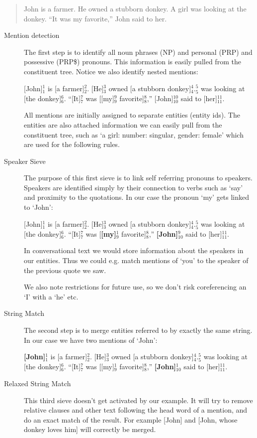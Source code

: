 \documentclass[12pt]{article}
\begin{document}
\begin{quotation}
John is a farmer. He owned a stubborn donkey.
A girl was looking at the donkey.
``It was my favorite,'' John said to her.
\end{quotation}

\begin{description}
\item[Mention detection]
The first step is to identify all noun phrases (NP) and personal (PRP) and possessive (PRP\$) pronouns. This information is easily pulled from the constituent tree. Notice we also identify nested mentions:

[John]$_1^1$ is [a farmer]$_2^2$. [He]$_3^3$ owned [a stubborn donkey]$_4^4$.\newline
[A girl]$_5^5$ was looking at [the donkey]$_6^6$.\newline
``[It]$_7^7$ was [[my]$_9^9$ favorite]$_8^8$,'' [John]$_{10}^{10}$ said to [her]$_{11}^{11}$.

All mentions are initially assigned to separate entities (entity ids). The entities are also attached information we can easily pull from the constituent tree, such as `a girl: {number: singular, gender: female}' which are used for the following rules.
\item[Speaker Sieve]
The purpose of this first sieve is to link self referring pronouns to speakers. Speakers are identified simply by their connection to verbs such as `say' and proximity to the quotations. In our case the pronoun `my' gets linked to `John':

[John]$_1^1$ is [a farmer]$_2^2$. [He]$_3^3$ owned [a stubborn donkey]$_4^4$.\newline
[A girl]$_5^5$ was looking at [the donkey]$_6^6$.\newline
``[It]$_7^7$ was [\textbf{[my]$_9^1$} favorite]$_8^8$,'' \textbf{[John]$_{10}^{9}$} said to [her]$_{11}^{11}$.

In conversational text we would store information about the speakers in our entities. Thus we could e.g. match mentions of `you' to the speaker of the previous quote we saw.

We also note restrictions for future use, so we don't risk coreferencing an `I' with a `he' etc.
\item[String Match]
The second step is to merge entities referred to by exactly the same string. In our case we have two mentions of `John':

\textbf{[John]$_1^1$} is [a farmer]$_2^2$. [He]$_3^3$ owned [a stubborn donkey]$_4^4$.\newline
[A girl]$_5^5$ was looking at [the donkey]$_6^6$.\newline
``[It]$_7^7$ was [[my]$_9^1$ favorite]$_8^8$,'' \textbf{[John]$_{10}^{1}$} said to [her]$_{11}^{11}$.
\item[Relaxed String Match]
This third sieve doesn't get activated by our example. It will try to remove relative clauses and other text following the head word of a mention, and do an exact match of the result. For example [John] and [John, whose donkey loves him] will correctly be merged.


\end{description}
\end{document}
